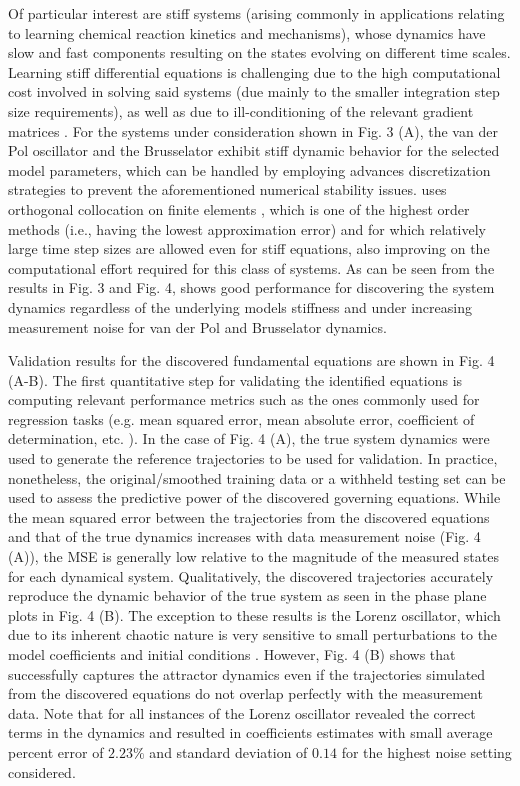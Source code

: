 \documentclass[12pt]{article}
\begin{document}
Of particular interest are stiff systems (arising commonly in  applications relating to learning chemical reaction kinetics and mechanisms), whose dynamics have slow and fast components resulting on the states evolving on different time scales. Learning stiff differential equations is challenging due to the high computational cost involved in solving said systems (due mainly to the smaller integration step size requirements), as well as due to ill-conditioning of the relevant gradient matrices \cite{kim2021stiff}. For the systems under consideration shown in Fig. 3 (A), the van der Pol oscillator and the Brusselator  exhibit stiff dynamic behavior for the selected model parameters, which can be handled by employing advances discretization strategies to prevent the aforementioned numerical stability issues. \ours{} uses orthogonal collocation on finite elements \cite{biegler2010nonlinear}, which is one of the highest order methods (i.e., having the lowest approximation error) and for which relatively large time step sizes are allowed even for stiff equations, also improving on the computational effort required for this class of systems. As can be seen from the results in Fig. 3 and Fig. 4, \ours{} shows good performance for discovering the system dynamics regardless of the underlying models stiffness and under increasing measurement noise for van der Pol and Brusselator dynamics.


Validation results for the discovered fundamental equations are shown in Fig. 4 (A-B). The first quantitative step for validating the identified equations is computing relevant performance metrics such as the ones commonly used for regression tasks (e.g. mean squared error, mean absolute error, coefficient of determination, etc. \cite{pedregosa2011scikit}). In the case of Fig. 4 (A), the true system dynamics were used to generate the reference trajectories to be used for validation. In practice, nonetheless, the original/smoothed training data  or a withheld testing set can be used to assess the  predictive power of the discovered governing equations. While the mean squared error between the trajectories from the discovered equations and that of the true dynamics increases with data measurement noise (Fig. 4 (A)), the MSE is generally low relative to the magnitude of the measured states for each dynamical system. Qualitatively, the discovered trajectories accurately reproduce the dynamic behavior of the true system as seen in the phase plane plots in Fig. 4 (B).  The exception to these results is the Lorenz oscillator, which due to its inherent chaotic nature is very sensitive to small perturbations to the model coefficients and initial conditions \cite{brunton2016discovering}. However, Fig. 4 (B) shows that  \ours{} successfully captures the attractor dynamics even if the trajectories simulated from the discovered equations do not overlap perfectly with the measurement data. Note that for all instances of the Lorenz oscillator \ours{} revealed the correct terms in the dynamics and resulted in coefficients estimates with small average percent error of $2.23\%$ and standard deviation of $0.14$ for the highest noise setting considered.
\end{document}
